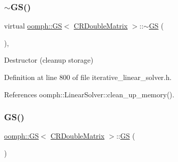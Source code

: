 \mbox{\label{classoomph_1_1GS_3_01CRDoubleMatrix_01_4_af3f4b25c6496b14667881b4777933897}} 
\subsubsection{\texorpdfstring{$\sim$\+G\+S()}{~GS()}}
{\footnotesize\ttfamily virtual \hyperlink{classoomph_1_1GS}{oomph\+::\+GS}$<$ \hyperlink{classoomph_1_1CRDoubleMatrix}{C\+R\+Double\+Matrix} $>$\+::$\sim$\hyperlink{classoomph_1_1GS}{GS} (\begin{DoxyParamCaption}{ }\end{DoxyParamCaption})\hspace{0.3cm}{\ttfamily [inline]}, {\ttfamily [virtual]}}



Destructor (cleanup storage) 



Definition at line 800 of file iterative\+\_\+linear\+\_\+solver.\+h.



References oomph\+::\+Linear\+Solver\+::clean\+\_\+up\+\_\+memory().

\mbox{\label{classoomph_1_1GS_3_01CRDoubleMatrix_01_4_afc211e223a3f71ecbef9ee8eb9ee05db}} 
\subsubsection{\texorpdfstring{G\+S()}{GS()}\hspace{0.1cm}{\footnotesize\ttfamily [2/2]}}
{\footnotesize\ttfamily \hyperlink{classoomph_1_1GS}{oomph\+::\+GS}$<$ \hyperlink{classoomph_1_1CRDoubleMatrix}{C\+R\+Double\+Matrix} $>$\+::\hyperlink{classoomph_1_1GS}{GS} (\begin{DoxyParamCaption}\item[{const \hyperlink{classoomph_1_1GS}{GS}$<$ \hyperlink{classoomph_1_1CRDoubleMatrix}{C\+R\+Double\+Matrix} $>$ \&}]{ }\end{DoxyParamCaption})\hspace{0.3cm}{\ttfamily [inline]}}



